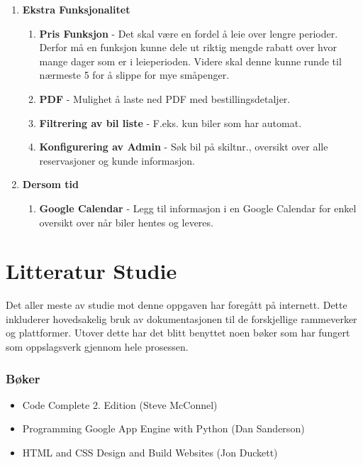 \begin{enumerate}
  \item \textbf{Ekstra Funksjonalitet}
	\begin{enumerate}
		\item \textbf{Pris Funksjon} - Det skal være en fordel å leie over lengre perioder. Derfor må en funksjon kunne dele ut riktig mengde rabatt over hvor mange dager som er i leieperioden. Videre skal denne kunne runde til nærmeste 5 for å slippe for mye småpenger.
		\item \textbf{PDF} - Mulighet å laste ned PDF med bestillingsdetaljer.
		\item \textbf{Filtrering av bil liste} - F.eks. kun biler som har automat. 
		\item \textbf{Konfigurering av Admin} - Søk bil på skiltnr., oversikt over alle reservasjoner og kunde informasjon.
	\end{enumerate}
  \item \textbf{Dersom tid}
  	\begin{enumerate}
  	\item \textbf{Google Calendar} - Legg til informasjon i en Google Calendar for enkel oversikt over når biler hentes og leveres.
  	\end{enumerate}
 
 \end{enumerate}


\section{Litteratur Studie}
Det aller meste av studie mot denne oppgaven har foregått på internett. Dette inkluderer hovedsakelig bruk av dokumentasjonen til de forskjellige rammeverker og plattformer. Utover dette har det blitt benyttet noen bøker som har fungert som oppslagsverk gjennom hele prosessen.

\subsubsection*{Bøker}
\begin{itemize}
\item Code Complete 2. Edition (Steve McConnel)
\item Programming Google App Engine with Python (Dan Sanderson)
\item HTML and CSS Design and Build Websites (Jon Duckett)
\end{itemize}
\newpage